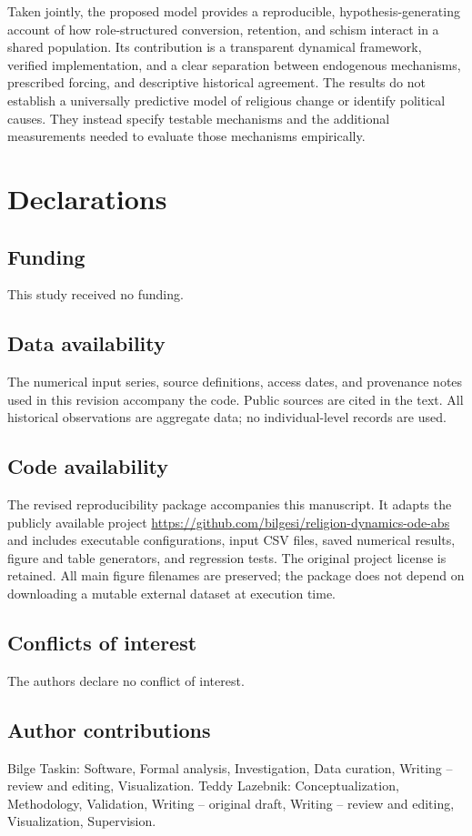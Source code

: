 Taken jointly, the proposed model provides a reproducible, hypothesis-generating account of how role-structured conversion, retention, and schism interact in a shared population. Its contribution is a transparent dynamical framework, verified implementation, and a clear separation between endogenous mechanisms, prescribed forcing, and descriptive historical agreement. The results do not establish a universally predictive model of religious change or identify political causes. They instead specify testable mechanisms and the additional measurements needed to evaluate those mechanisms empirically.

\section*{Declarations}
\subsection*{Funding}
This study received no funding.
\subsection*{Data availability}
The numerical input series, source definitions, access dates, and provenance notes used in this revision accompany the code. Public sources are cited in the text. All historical observations are aggregate data; no individual-level records are used.
\subsection*{Code availability}
The revised reproducibility package accompanies this manuscript. It adapts the publicly available project \url{https://github.com/bilgesi/religion-dynamics-ode-abs} \cite{upstream_code} and includes executable configurations, input CSV files, saved numerical results, figure and table generators, and regression tests. The original project license is retained. All main figure filenames are preserved; the package does not depend on downloading a mutable external dataset at execution time.
\subsection*{Conflicts of interest}
The authors declare no conflict of interest.
\subsection*{Author contributions}
Bilge Taskin: Software, Formal analysis, Investigation, Data curation, Writing -- review and editing, Visualization. Teddy Lazebnik: Conceptualization, Methodology, Validation, Writing -- original draft, Writing -- review and editing, Visualization, Supervision.

